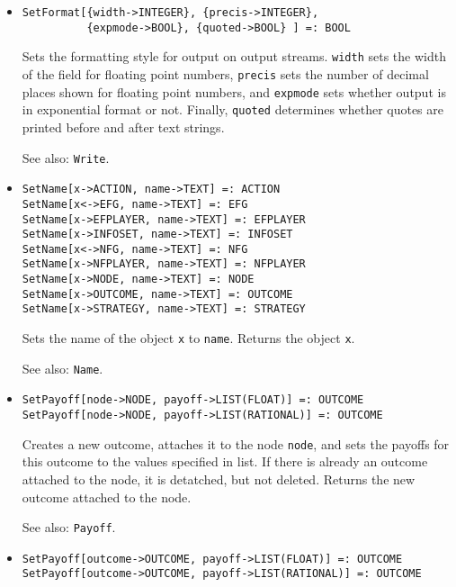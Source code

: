 \begin{itemize}
\item
\protect \large \begin{verbatim}
SetFormat[{width->INTEGER}, {precis->INTEGER}, 
          {expmode->BOOL}, {quoted->BOOL} ] =: BOOL
\end{verbatim}\normalsize

\bd 
Sets the formatting style for output on output streams.
\verb+width+ sets the width of the field for floating point numbers,
\verb+precis+ sets the number of decimal places shown for floating
point numbers, and \verb+expmode+ sets whether output is in
exponential format or not.  Finally, \verb+quoted+ determines whether
quotes are printed before and after text strings.
\item
[See also:] {\tt Write}.
\ed

\item
\protect \large \begin{verbatim}
SetName[x->ACTION, name->TEXT] =: ACTION
SetName[x<->EFG, name->TEXT] =: EFG
SetName[x->EFPLAYER, name->TEXT] =: EFPLAYER
SetName[x->INFOSET, name->TEXT] =: INFOSET
SetName[x<->NFG, name->TEXT] =: NFG
SetName[x->NFPLAYER, name->TEXT] =: NFPLAYER
SetName[x->NODE, name->TEXT] =: NODE
SetName[x->OUTCOME, name->TEXT] =: OUTCOME
SetName[x->STRATEGY, name->TEXT] =: STRATEGY
\end{verbatim}\normalsize

\bd
Sets the name of the object \verb+x+ to \verb+name+.
Returns the object \verb+x+.
\item
[See also:] {\tt Name}.
\ed

\item
\protect \large \begin{verbatim}
SetPayoff[node->NODE, payoff->LIST(FLOAT)] =: OUTCOME
SetPayoff[node->NODE, payoff->LIST(RATIONAL)] =: OUTCOME
\end{verbatim}\normalsize

\bd
Creates a new outcome, attaches it to the node \verb+node+, and sets
the payoffs for this outcome to the values specified in list.  If
there is already an outcome attached to the node, it is detatched, but
not deleted.  Returns the new outcome attached to the node.  
\item
[See also:] {\tt Payoff}.
\ed

\item
\protect \large \begin{verbatim}
SetPayoff[outcome->OUTCOME, payoff->LIST(FLOAT)] =: OUTCOME
SetPayoff[outcome->OUTCOME, payoff->LIST(RATIONAL)] =: OUTCOME
\end{verbatim}\normalsize


\end{itemize}
